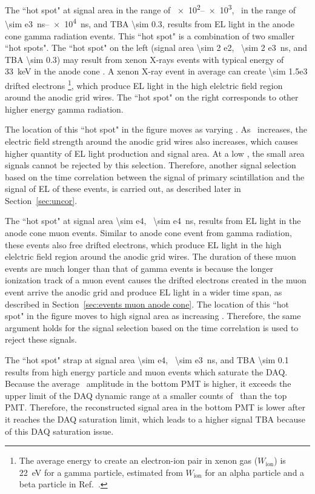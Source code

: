 The ``hot spot" at signal area in the range of \SIrange{e2}{e3}{\phe}, \rpd\ in the range of \SIrange{\sim e3}{e4}{\ns}, and TBA \num{\sim 0.3}, results from EL light in the anode cone gamma radiation events. This ``hot spot" is a combination of two smaller ``hot spots". The ``hot spot" on the left (signal area \SI{\sim 2 e2}{\phe}, \rpd\ \SI{\sim 2 e3}{\ns}, and TBA \num{\sim 0.3}) may result from xenon X-rays events with typical energy of \SI{33}{\keV} in the anode cone . A xenon X-ray event in average can create \num{\sim 1.5e3} drifted electrons \footnote{The average energy to create an electron-ion pair in xenon gas ($W_\text{ion}$) is \SI{22}{\eV} for a gamma particle, estimated from $W_\text{ion}$ for an alpha particle and a beta particle in Ref.~\cite{Fano1963, Ahlen1980, Alvarez2013}.}, which produce EL light in the high elelctric field region around the anodic grid wires. The ``hot spot" on the right corresponds to other higher energy gamma radiation.

The location of this ``hot spot"  in the figure moves as varying \opdv . As \opdv\ increases, the electric field strength around the anodic grid wires also increases, which causes higher quantity of EL light production and signal area. At a low \opdv , the small area signals cannot be rejected by this selection. Therefore, another signal selection based on the time correlation between the signal of primary scintillation and the signal of EL of these events, is carried out, as described later in Section~\ref{sec:uncor}.

The ``hot spot" at signal area \SI{\sim e4}{\phe}, \rpd\ \SI{\sim e4}{\ns}, results from EL light in the anode cone muon events. Similar to anode cone event from gamma radiation, these events also free drifted electrons, which produce EL light in the high elelctric field region around the anodic grid wires. The duration of these muon events are much longer than that of gamma events is because the longer ionization track of a muon event causes the drifted electrons created in the muon event arrive the anodic grid and produce EL light in a wider time span, as described in Section~\ref{sec:events muon anode cone}. The location of this ``hot spot"  in the figure moves to high signal area as increasing \opdv . Therefore, the same argument holds for the signal selection based on the time correlation is used to reject these signals. 

The ``hot spot" strap at signal area \SI{\sim e4}{\phe}, \rpd\ \SI{\sim e3}{\ns}, and TBA \num{\sim 0.1} results from high energy particle and muon events which saturate the DAQ. Because the average \sphe\ amplitude in the bottom PMT is higher, it exceeds the upper limit of the DAQ dynamic range at a smaller counts of \sphe\ than the top PMT. Therefore, the reconstructed signal area in the bottom PMT is lower after it reaches the DAQ saturation limit, which leads to a higher signal TBA because of this DAQ saturation issue.

